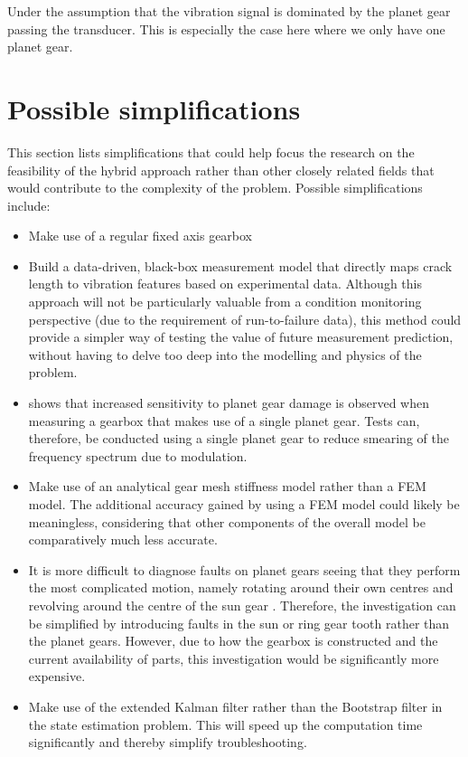Under the assumption that the vibration signal is dominated by the planet gear passing the transducer. This is especially the case here where we only have one planet gear.





\section{Possible simplifications}
This section lists simplifications that could help focus the research on the feasibility of the hybrid approach rather than other closely related fields that would contribute to the complexity of the problem. Possible simplifications include:

\begin{itemize}
	\item Make use of a regular fixed axis gearbox
	\item Build a data-driven, black-box measurement model that directly maps crack length to vibration features based on experimental data. Although this approach will not be particularly valuable from a condition monitoring perspective (due to the requirement of run-to-failure data), this method could provide a simpler way of testing the value of future measurement prediction, without having to delve too deep into the modelling and physics of the problem.  
	\item \cite{Smidt2009} shows that increased sensitivity to planet gear damage is observed when measuring a gearbox that makes use of a single planet gear. Tests can, therefore, be conducted using a single planet gear to reduce smearing of the frequency spectrum due to modulation.
	\item Make use of an analytical gear mesh stiffness model rather than a FEM model. The additional accuracy gained by using a FEM model could likely be meaningless, considering that other components of the overall model be comparatively much less accurate.
	\item  It is more difficult to diagnose faults on planet gears seeing that they perform the most complicated motion, namely rotating around their own centres and revolving around the centre of the sun gear \citep{Lei2014}. Therefore, the investigation can be simplified by introducing faults in the sun or ring gear tooth rather than the planet gears. However, due to how the gearbox is constructed and the current availability of parts, this investigation would be significantly more expensive. 
	\item Make use of the extended Kalman filter rather than the Bootstrap filter in the state estimation problem. This will speed up the computation time significantly and thereby simplify troubleshooting.  

\end{itemize}

